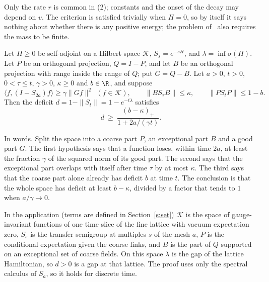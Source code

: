 Only the rate $r$ is common in (2); constants and the onset of the decay may depend on $v$. The criterion is
satisfied trivially when $H=0$, so by itself it says nothing about whether there is any positive energy; the
problem of~\cite{JW} also requires the mass to be finite.

\begin{theorem}\label{t:inh}
Let $H\ge0$ be self-adjoint on a Hilbert space $\mathcal K$, $S_s=e^{-sH}$, and $\lambda=\inf\sigma(H)$. Let
$P$ be an orthogonal projection, $Q=I-P$, and let $B$ be an orthogonal projection with range inside the range
of $Q$; put $G=Q-B$. Let $a>0$, $t>0$, $0<\tau\le t$, $\gamma>0$, $\kappa\ge0$ and $b\in\R$, and suppose
\begin{equation}\label{e:hyp}
\langle f,(I-S_{2a})f\rangle\ge\gamma\|Gf\|^2\ \ (f\in\mathcal K),\qquad
\|BS_\tau B\|\le\kappa,\qquad \|PS_tP\|\le1-b .
\end{equation}
Then the deficit $d=1-\|S_t\|=1-e^{-t\lambda}$ satisfies
\begin{equation}\label{e:inh}
d\ \ge\ \frac{(b-\kappa)_+}{1+2a/(\gamma t)} .
\end{equation}
\end{theorem}

In words. Split the space into a coarse part $P$, an exceptional part $B$ and a good part $G$. The first
hypothesis says that a function loses, within time $2a$, at least the fraction $\gamma$ of the squared norm of
its good part. The second says that the exceptional part overlaps with itself after time $\tau$ by at most
$\kappa$. The third says that the coarse part alone already has deficit $b$ at time $t$. The conclusion is that
the whole space has deficit at least $b-\kappa$, divided by a factor that tends to $1$ when $a/\gamma\to0$.

In the application (terms are defined in Section~\ref{s:set}) $\mathcal K$ is the space of gauge-invariant
functions of one time slice of the fine lattice with vacuum expectation zero, $S_s$ is the transfer semigroup
at multiples $s$ of the mesh $a$, $P$ is the conditional expectation given the coarse links, and $B$ is the
part of $Q$ supported on an exceptional set of coarse fields. On this space $\lambda$ is the gap of the lattice
Hamiltonian, so $d>0$ is a gap at that lattice. The proof uses only the spectral calculus of $S_a$, so it
holds for discrete time.

